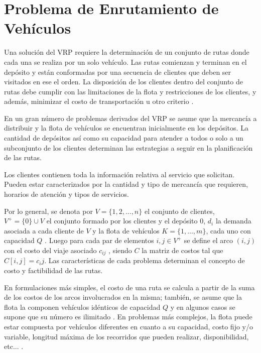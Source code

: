 
\section{Problema de Enrutamiento de Vehículos}\label{2-VRPintro}

Una solución del VRP requiere la determinación de un conjunto de rutas donde cada una se realiza por un solo vehículo. Las rutas comienzan y terminan en el depósito y están conformadas por una secuencia de clientes que deben ser visitados en ese el orden. La disposición de los clientes dentro del conjunto de rutas debe cumplir con las limitaciones de la flota y restricciones de los clientes, y además, minimizar el costo de transportación u otro criterio \cite{PaoloVigo}.

En un gran número de problemas derivados del VRP se asume que la mercancía a distribuir y la flota de vehículos se encuentran inicialmente en los depósitos. La cantidad de depósitos así como su capacidad para atender a todos o solo a un subconjunto de los clientes determinan las estrategias a seguir en la planificación de las rutas.

Los clientes contienen toda la información relativa al servicio que solicitan. Pueden estar caracterizados por la cantidad y tipo de mercancía que requieren, horarios de atención y tipos de servicios. 

Por lo general, se denota por $V = \{1, 2, ..., n\}$ el conjunto de clientes, $ V^{+} = \{0\} \cup V$ el conjunto formado por los clientes y el depósito $0$, $d_i$ la demanda asociada a cada cliente de $V$ y la flota de vehículos $K = \{1, ..., m\}$, cada uno con capacidad $Q$ . Luego para cada par de elementos $i, j \in V^{+}$ se define el arco $(i, j)$ con el costo del viaje asociado $c_{ij}$ , siendo $C$ la matriz de costos tal que $C[i, j] = c_ij$. Las características de cada problema determinan el concepto de costo y factibilidad de las rutas.

En formulaciones más simples, el costo de una ruta se calcula a partir de la suma de los costos de los arcos involucrados en la misma; también, se asume que la flota la componen vehículos idénticos de capacidad $Q$ y en algunos casos se supone que su número es ilimitado \cite{PaoloVigo}. En problemas más complejos, la flota puede estar compuesta por vehículos diferentes en cuanto a su capacidad, costo fijo y/o variable, longitud máxima de los recorridos que pueden realizar, disponibilidad, etc... \cite{PaoloVigo}. 

